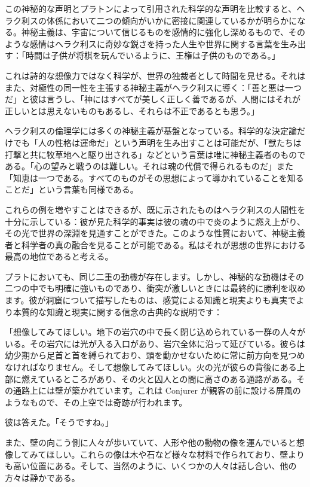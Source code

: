 \documentclass[a4paper,11pt,openany]{ltjsbook}
\begin{document}
この神秘的な声明とプラトンによって引用された科学的な声明を比較すると、ヘラク利スの体係において二つの傾向がいかに密接に関連しているかが明らかになる。神秘主義は、宇宙について信じるものを感情的に強化し深めるもので、そのような感情はヘラク利スに奇妙な鋭さを持った人生や世界に関する言葉を生み出す：「時間は子供が将棋を玩んでいるように、王権は子供のものである。」

これは詩的な想像力ではなく科学が、世界の独裁者として時間を見せる。それはまた、対極性の同一性を主張する神秘主義がヘラク利スに導く：「善と悪は一つだ」と彼は言うし、「神にはすべてが美しく正しく善であるが、人間にはそれが正しいとは思えないものもあるし、それらは不正であるとも思う。」

ヘラク利スの倫理学には多くの神秘主義が基盤となっている。科学的な決定論だけでも「人の性格は運命だ」という声明を生み出すことは可能だが、「獣たちは打撃と共に牧草地へと駆り出される」などという言葉は唯に神秘主義者のものである。「心の望みと戦うのは難しい。それは魂の代償で得られるものだ」また「知恵は一つである。すべてのものがその思想によって導かれていることを知ることだ」という言葉も同様である。

これらの例を増やすことはできるが、既に示されたものはヘラク利スの人間性を十分に示している：彼が見た科学的事実は彼の魂の中で炎のように燃え上がり、その光で世界の深淵を見通すことができた。このような性質において、神秘主義者と科学者の真の融合を見ることが可能である。私はそれが思想の世界における最高の地位であると考える。

プラトにおいても、同じ二重の動機が存在します。しかし、神秘的な動機はその二つの中でも明確に強いものであり、衝突が激しいときには最終的に勝利を収めます。彼が洞窟について描写したものは、感覚による知識と現実よりも真実でより本質的な知識と現実に関する信念の古典的な説明です：

「想像してみてほしい。地下の岩穴の中で長く閉じ込められている一群の人々がいる。その岩穴には光が入る入口があり、岩穴全体に沿って延びている。彼らは幼少期から足首と首を縛られており、頭を動かせないために常に前方向を見つめなければなりません。そして想像してみてほしい。火の光が彼らの背後にある上部に燃えているところがあり、その火と囚人との間に高さのある通路がある。その通路上には壁が築かれています。これは Conjurer が観客の前に設ける屏風のようなもので、その上空では奇跡が行われます。

彼は答えた。「そうですね。」

また、壁の向こう側に人々が歩いていて、人形や他の動物の像を運んでいると想像してみてほしい。これらの像は木や石など様々な材料で作られており、壁よりも高い位置にある。そして、当然のように、いくつかの人々は話し合い、他の方々は静かである。
\end{document}
